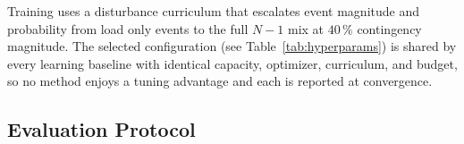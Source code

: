 \documentclass[lettersize,journal]{IEEEtran}
\begin{document}
	
	
	\begin{table}[!t]
		\caption{Hyperparameters selected using ASHA.}
		\label{tab:hyperparams}
		\centering
		\footnotesize
	\end{table}
	
	
	
	
	
	
	
	
	
	
	Training uses a disturbance curriculum that escalates event magnitude and probability from load only events to the full $N{-}1$ mix at $40\,\%$ contingency magnitude. The selected configuration (see Table~\ref{tab:hyperparams}) is shared by every learning baseline with identical capacity, optimizer, curriculum, and budget, so no method enjoys a tuning advantage and each is reported at convergence.
	
	
	\subsection{Evaluation Protocol}
	\label{sec:casestudy:metrics}
	
\end{document}
